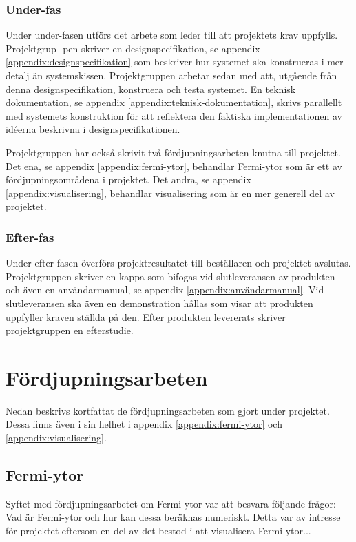 \documentclass[a4paper,12pt]{article}
\begin{document}
\subsubsection{Under-fas}
Under  under-fasen  utförs  det  arbete  som  leder  till  att  projektets  krav  uppfylls.  Projektgrup-
pen skriver en designspecifikation, se appendix \ref{appendix:designspecifikation}
som beskriver hur systemet ska konstrueras i mer detalj än
systemskissen. Projektgruppen arbetar sedan med att, utgående från denna designspecifikation, konstruera och testa systemet. En teknisk dokumentation, se appendix \ref{appendix:teknisk-dokumentation}, skrivs parallellt med systemets konstruktion för att reflektera den faktiska implementationen av idéerna beskrivna i designspecifikationen. 

Projektgruppen har också skrivit två fördjupningsarbeten knutna till projektet. Det ena, se appendix \ref{appendix:fermi-ytor}, behandlar Fermi-ytor som är ett av fördjupningsområdena i projektet. Det andra, se appendix \ref{appendix:visualisering}, behandlar visualisering som är en mer generell del av projektet. 

\subsubsection{Efter-fas}
Under efter-fasen överförs projektresultatet till beställaren och projektet avslutas. Projektgruppen skriver en kappa som bifogas vid slutleveransen av produkten och även en användarmanual, se appendix \ref{appendix:användarmanual}. Vid slutleveransen ska
även en demonstration hållas som visar att produkten uppfyller kraven ställda på den. Efter produkten levererats skriver projektgruppen en efterstudie.

\section{Fördjupningsarbeten}
\label{ch:fördjupningsarbeten}
Nedan beskrivs kortfattat de fördjupningsarbeten som gjort under projektet. Dessa finns även i sin helhet i appendix \ref{appendix:fermi-ytor} och \ref{appendix:visualisering}. 
\subsection{Fermi-ytor}
Syftet med fördjupningsarbetet om Fermi-ytor var att besvara följande frågor: Vad är Fermi-ytor och hur kan dessa beräknas numeriskt. Detta var av intresse för projektet eftersom en del av det bestod i att visualisera Fermi-ytor...
\end{document}
